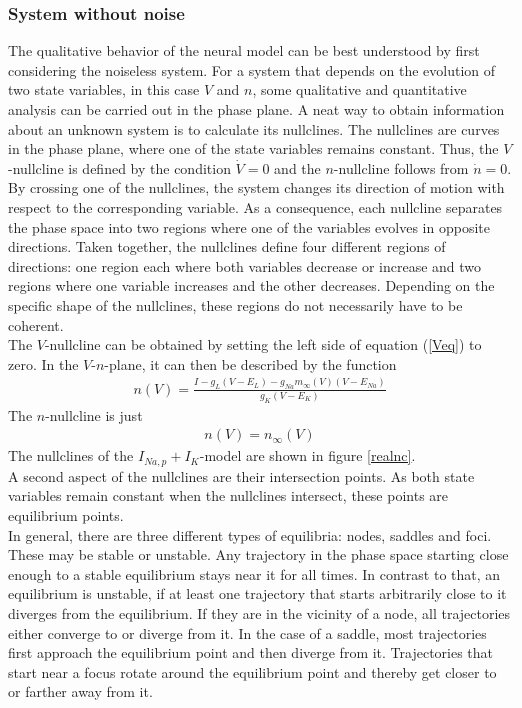 \documentclass[12pt,a4paper]{article}
\begin{document}
\subsubsection{System without noise}\label{mod1won}
The qualitative behavior of the neural model can be best understood by first considering the noiseless system.
For a system that depends on the evolution of two state variables, in this case $V$ and $n$, some qualitative and quantitative analysis can be carried out in the phase plane. A neat way to obtain information about an unknown system is to calculate its nullclines. The nullclines are curves in the phase plane, where one of the state variables remains constant. Thus, the $V$-nullcline is defined by the condition $\dot{V}=0$ and the $n$-nullcline follows from $\dot{n}=0$. By crossing one of the nullclines, the system changes its direction of motion with respect to the corresponding variable. As a consequence, each nullcline separates the phase space into two regions where one of the variables evolves in opposite directions. Taken together, the nullclines define four different regions of directions: one region each where both variables decrease or increase and two regions where one variable increases and the other decreases. Depending on the specific shape of the nullclines, these regions do not necessarily have to be coherent.\\
The $V$-nullcline can be obtained by setting the left side of equation (\ref{Veq}) to zero. In the $V$-$n$-plane, it can then be described by the function
\begin{align}
n(V)=\frac{I - g_L(V-E_L) - g_{Na}m_{\infty}(V)(V-E_{Na})}{g_K(V-E_K)}
\end{align} 
The $n$-nullcline is just
\begin{align}
n(V)=n_\infty(V)
\end{align}
The nullclines of the $I_{Na,p}+I_K$-model are shown in figure \ref{realnc}.\\
A second aspect of the nullclines are their intersection points. As both state variables remain constant when the nullclines intersect, these points are equilibrium points.\\
In general, there are three different types of equilibria: nodes, saddles and foci. These may be stable or unstable. Any trajectory in the phase space starting close enough to a stable equilibrium stays near it for all times. In contrast to that, an equilibrium is unstable, if at least one trajectory that starts arbitrarily close to it diverges from the equilibrium.
If they are in the vicinity of a node, all trajectories either converge to or diverge from it. In the case of a saddle, most trajectories first approach the equilibrium point and then diverge from it. Trajectories that start near a focus rotate around the equilibrium point and thereby get closer to or farther away from it. 
\end{document}
